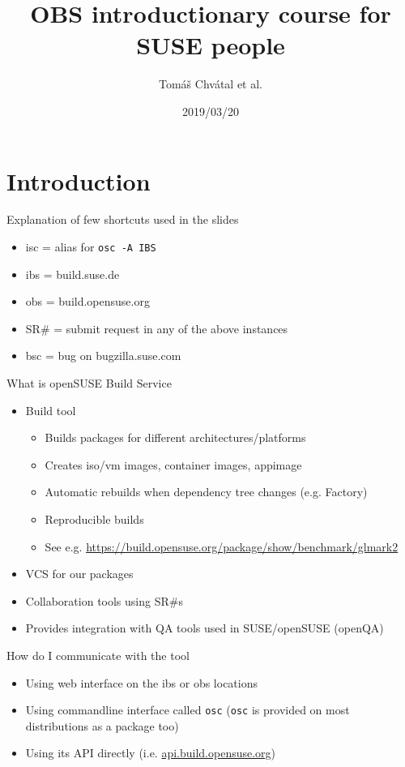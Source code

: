 \documentclass{beamer}
\author{Tom\'{a}\v{s} Chv\'{a}tal et al.\newline {\small tchvatal@suse.com}\newline {\small Packaging/L3 - Packaging}}
\title{OBS introductionary course for SUSE people}
\date{2019/03/20}
\begin{document}
\begin{frame}[t,plain]
\titlepage
\end{frame}

\section{Introduction}

\begin{frame}[t]{Explanation of few shortcuts used in the slides}
	\begin{itemize}
	\item isc = alias for \texttt{osc -A IBS}
	\item ibs = build.suse.de
	\item obs = build.opensuse.org
	\item SR\# = submit request in any of the above instances
	\item bsc = bug on bugzilla.suse.com
	\end{itemize}
\end{frame}

\begin{frame}[t]{What is openSUSE Build Service}
	\begin{itemize}
	\item Build tool
    \begin{itemize}
      \item Builds packages for different architectures/platforms
      \item Creates iso/vm images, container images, appimage
      \item Automatic rebuilds when dependency tree changes (e.g. Factory)
      \item Reproducible builds
      \item See e.g. \url{https://build.opensuse.org/package/show/benchmark/glmark2}
    \end{itemize}
	\item VCS for our packages
	\item Collaboration tools using SR\#s
  \item Provides integration with QA tools used in SUSE/openSUSE (openQA)
	\end{itemize}
\end{frame}

\begin{frame}[t]{How do I communicate with the tool}
	\begin{itemize}
	\item Using web interface on the ibs or obs locations
	\item Using commandline interface called \texttt{osc} (\texttt{osc} is provided on most distributions as a package too)
  \item Using its API directly (i.e. \url{api.build.opensuse.org})
	\end{itemize}
\end{frame}
\end{document}
